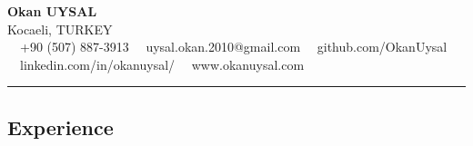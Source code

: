 \documentclass[11pt,letterpaper]{article}
\begin{document}
\begin{center}
	{\LARGE \textbf{Okan UYSAL}}\\
	Kocaeli, TURKEY
	\vspace{0.04cm}
	\\
	\raisebox{-0.2\height} {\Large \faPhoneSquare} \ \  +90 (507) 887-3913 \hfill\raisebox{-0.2\height}{\Large \faEnvelopeSquare} \ \ uysal.okan.2010@gmail.com \hfill \raisebox{-0.2\height}{\Large \faGithubSquare} \ \ github.com/OkanUysal 
	\\
	\raisebox{-0.2\height}{\Large \faLinkedinSquare} \ \ linkedin.com/in/okanuysal/ \raisebox{-0.2\height}{\Large \faGlobe} \ \ www.okanuysal.com
\end{center}


\hrule
\vspace{-1em}
\subsection*{\Large Experience}
\end{document}
